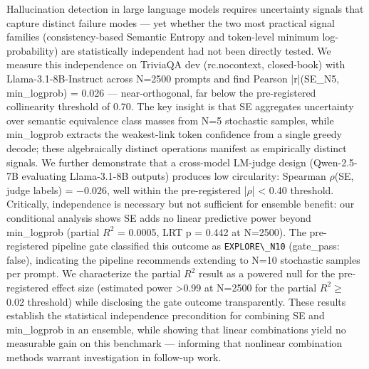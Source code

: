 
Hallucination detection in large language models requires uncertainty signals that capture distinct failure modes --- yet whether the two most practical signal families (consistency-based Semantic Entropy and token-level minimum log-probability) are statistically independent had not been directly tested. We measure this independence on TriviaQA dev (rc.nocontext, closed-book) with Llama-3.1-8B-Instruct across N=2500 prompts and find Pearson |r|(SE\_N5, min\_logprob) = 0.026 --- near-orthogonal, far below the pre-registered collinearity threshold of 0.70. The key insight is that SE aggregates uncertainty over semantic equivalence class masses from N=5 stochastic samples, while min\_logprob extracts the weakest-link token confidence from a single greedy decode; these algebraically distinct operations manifest as empirically distinct signals. We further demonstrate that a cross-model LM-judge design (Qwen-2.5-7B evaluating Llama-3.1-8B outputs) produces low circularity: Spearman $\rho$(SE, judge labels) = $-0.026$, well within the pre-registered |$\rho$| < 0.40 threshold. Critically, independence is necessary but not sufficient for ensemble benefit: our conditional analysis shows SE adds no linear predictive power beyond min\_logprob (partial $R^2$ = 0.0005, LRT p = 0.442 at N=2500). The pre-registered pipeline gate classified this outcome as \texttt{EXPLORE\textbackslash \_N10} (gate\_pass: false), indicating the pipeline recommends extending to N=10 stochastic samples per prompt. We characterize the partial $R^2$ result as a powered null for the pre-registered effect size (estimated power >0.99 at N=2500 for the partial $R^2 \geq$ 0.02 threshold) while disclosing the gate outcome transparently. These results establish the statistical independence precondition for combining SE and min\_logprob in an ensemble, while showing that linear combinations yield no measurable gain on this benchmark --- informing that nonlinear combination methods warrant investigation in follow-up work.

